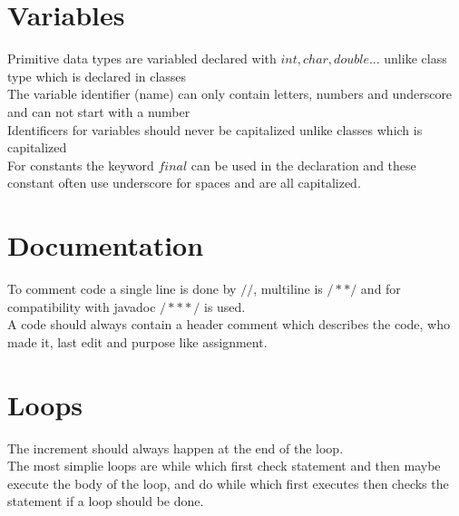 \documentclass[12pt, a4paper]{article}
\begin{document}
		\section{Variables}
			Primitive data types are variabled declared with $int,char,double...$ unlike class type which is declared in classes\\
			The variable identifier (name) can only contain letters, numbers and underscore and can not start with a number\\
			Identificers for variables should never be capitalized unlike classes which is capitalized\\
			For constants the keyword $final$ can be used in the declaration and these constant often use underscore for spaces and are all capitalized.\\
		\section{Documentation}
			To comment code a single line is done by $//$, multiline is $/* */$ and for compatibility with javadoc $/** */$ is used.\\
			A code should always contain a header comment which describes the code, who made it, last edit and purpose like assignment.\\
		\section{Loops}
			The increment should always happen at the end of the loop.\\
			The most simplie loops are while which first check statement and then maybe execute the body of the loop, and do while which first executes then checks the statement if a loop should be done.\\
			
			
\end{document}
